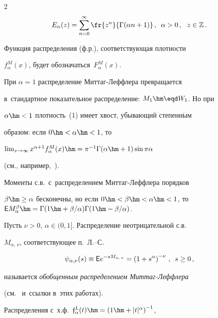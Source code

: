 \begin{multicols}{2}
$$


E_{\alpha}(z)=\sum\limits_{n=0}^{\infty}\fr{z^n}{\Gamma(\alpha


n+1)}\,,\enskip \alpha>0\,,\ \ z\in\mathbb{Z}\,.


$$


Функция распределения (ф.р.), соответствующая плотности


$f_{\alpha}^{M}(x)$, будет обозначаться~$F_{\alpha}^{M}(x)$.





При $\alpha=1$ распределение Мит\-таг-Леф\-фле\-ра превращается 


в~стандартное показательное распределение: $M_1\hm\eqd W_1$. Но при


$\alpha\hm<1$ плот\-ность~(1) имеет хвост, убывающий степенн$\acute{\mbox{ы}}$м


образом: если $0\hm<\alpha\hm<1$, то


$\lim\nolimits_{x\to\infty}


x^{\alpha+1}f_\alpha^{M}(x)\hm=\pi^{-1}\Gamma(\alpha\hm+1)\sin\pi\alpha$


(см., например,~\cite{Kilbas2014}).





Моменты с.в.\ с~распределением Мит\-таг-Леф\-фле\-ра порядков


$\beta\hm\ge\alpha$ бесконечны, но если $0\hm<\beta\hm<\alpha\hm<1$, то ${\sf E}


M_{\alpha}^{\beta}\hm={\Gamma(1\hm+{\beta}/{\alpha})\Gamma(1\hm-{\beta}/{\alpha})}$.





Пусть $\nu>0$, $\alpha\in(0,1]$. Распределение неотрицательной с.в.\


$M_{\alpha,\,\nu}$, соответствующее п.~Л.--С.


$$


\psi_{\alpha,\nu}(s)\equiv {\sf E}


e^{-sM_{\alpha,\,\nu}}=\left(1+s^{\alpha}\right)^{-\nu}\,,\enskip s\ge0\,,


$$


называется \textit{обобщенным распределением Мит\-таг-Леф\-фле\-ра} 


(см.~\cite{MathaiHaubold2011, Joseetal} и~ссылки в~этих работах).





Распределения с~х.ф.~$\mathfrak{f}^{L}_{\alpha}(t)\hm=\left(1\hm+|t|^{\alpha}\right)^{-1}$,



\end{multicols}
